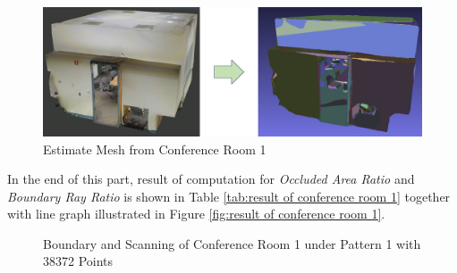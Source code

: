 \documentclass[11pt, a4paper,oneside,chapterprefix=false]{scrbook}
\begin{document}
\vspace{30pt}

\begin{figure}[H]
    \centering
    \includegraphics*[width=1.0\textwidth]{figures/estimate conf1.png}
    \caption{Estimate Mesh from Conference Room 1}
    \label{fig:estimate mesh from conference room 1}
\end{figure}

\vspace{30pt}

In the end of this part, result of computation for \emph{Occluded Area Ratio} and \emph{Boundary Ray Ratio} is shown in Table \ref{tab:result of conference room 1} together with line graph illustrated in Figure \ref{fig:result of conference room 1}.

\vspace{30pt}

\begin{figure}[H]
    \centering
      \label{fig:conf1 0 b} \hfill
     \label{fig:conf1 0 s}
    \caption{Boundary and Scanning of Conference Room 1 under Pattern 1 with 38372 Points}
    \label{fig:conf1 0}
\end{figure}
\end{document}
